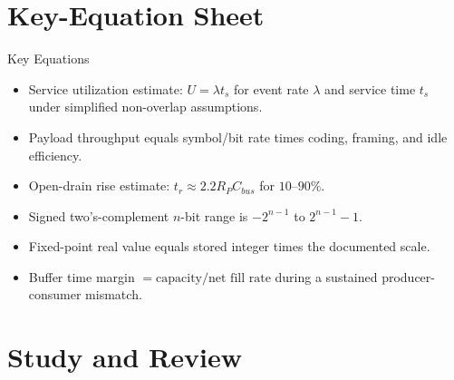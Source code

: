 \documentclass[10pt,letterpaper]{article}
\begin{document}
\section{Key-Equation Sheet}
\begin{CornellExamBox}{Key Equations}
\begin{itemize}
  \item Service utilization estimate: $U=\lambda t_s$ for event rate $\lambda$ and service time $t_s$ under simplified non-overlap assumptions.
  \item Payload throughput equals symbol/bit rate times coding, framing, and idle efficiency.
  \item Open-drain rise estimate: $t_r\approx2.2R_PC_{bus}$ for $10$--$90\%$.
  \item Signed two's-complement $n$-bit range is $-2^{n-1}$ to $2^{n-1}-1$.
  \item Fixed-point real value equals stored integer times the documented scale.
  \item Buffer time margin $=\text{capacity}/\text{net fill rate}$ during a sustained producer-consumer mismatch.
\end{itemize}\end{CornellExamBox}
\section{Study and Review}
\end{document}
